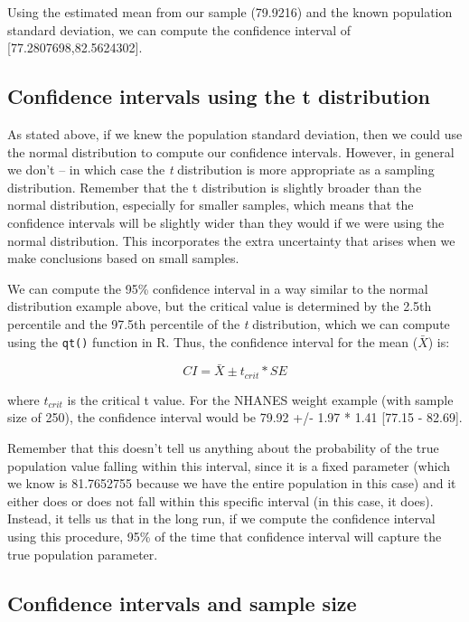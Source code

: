 \documentclass[12pt,]{book}
\begin{document}
Using the estimated mean from our sample (79.9216) and the known population standard deviation, we can compute the confidence interval of {[}77.2807698,82.5624302{]}.

\hypertarget{confidence-intervals-using-the-t-distribution}{%
\subsection{Confidence intervals using the t distribution}\label{confidence-intervals-using-the-t-distribution}}

As stated above, if we knew the population standard deviation, then we could use the normal distribution to compute our confidence intervals. However, in general we don't -- in which case the \emph{t} distribution is more appropriate as a sampling distribution. Remember that the t distribution is slightly broader than the normal distribution, especially for smaller samples, which means that the confidence intervals will be slightly wider than they would if we were using the normal distribution. This incorporates the extra uncertainty that arises when we make conclusions based on small samples.

We can compute the 95\% confidence interval in a way similar to the normal distribution example above, but the critical value is determined by the 2.5th percentile and the 97.5th percentile of the \emph{t} distribution, which we can compute using the \texttt{qt()} function in R. Thus, the confidence interval for the mean (\(\bar{X}\)) is:

\[
CI = \bar{X} \pm t_{crit}*SE
\]

where \(t_{crit}\) is the critical t value.
For the NHANES weight example (with sample size of 250), the confidence interval would be 79.92 +/- 1.97 * 1.41 {[}77.15 - 82.69{]}.

Remember that this doesn't tell us anything about the probability of the true population value falling within this interval, since it is a fixed parameter (which we know is 81.7652755 because we have the entire population in this case) and it either does or does not fall within this specific interval (in this case, it does). Instead, it tells us that in the long run, if we compute the confidence interval using this procedure, 95\% of the time that confidence interval will capture the true population parameter.

\hypertarget{confidence-intervals-and-sample-size}{%
\subsection{Confidence intervals and sample size}\label{confidence-intervals-and-sample-size}}
\end{document}
